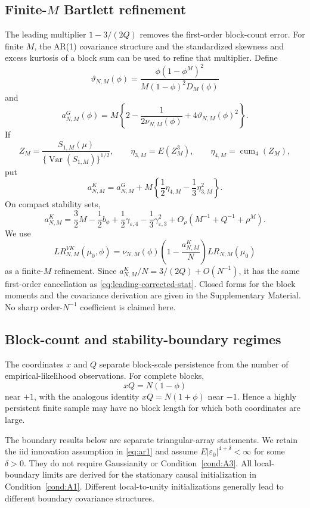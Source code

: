 \documentclass[12pt]{article}
\theoremstyle{remark}
\begin{document}
\subsection{Finite-$M$ Bartlett refinement}
The leading multiplier $1-3/(2Q)$ removes the first-order block-count error. For finite $M$, the AR(1) covariance structure and the standardized skewness and excess kurtosis of a block sum can be used to refine that multiplier. Define
\[
\vartheta_{N,M}(\phi)
=
\frac{\phi(1-\phi^M)^2}{M(1-\phi)^2D_M(\phi)}
\]
and
\begin{equation}
a^G_{N,M}(\phi)
=
M\left\{2-\frac{1}{2\nu_{N,M}(\phi)}
+4\vartheta_{N,M}(\phi)^2\right\}.
\label{eq:aG-refined}
\end{equation}
If
\[
Z_M=\frac{S_{1,M}(\mu)}{\{\operatorname{Var}(S_{1,M})\}^{1/2}},
\qquad
\eta_{3,M}=E(Z_M^3),
\qquad
\eta_{4,M}=\operatorname{cum}_4(Z_M),
\]
put
\begin{equation}
a^K_{N,M}
=
a^G_{N,M}
+
M\left\{\frac12\eta_{4,M}-\frac13\eta_{3,M}^2\right\}.
\label{eq:aK-refined}
\end{equation}
On compact stability sets,
\begin{equation}
a^K_{N,M}
=
\frac32M-\frac12b_\phi
+\frac12\gamma_{\varepsilon,4}
-\frac13\gamma_{\varepsilon,3}^2
+O_\rho(M^{-1}+Q^{-1}+\rho^M).
\label{eq:aK-expansion}
\end{equation}
We use
\begin{equation}
LR^{VK}_{N,M}(\mu_0,\phi)
=
\nu_{N,M}(\phi)
\left(1-\frac{a^K_{N,M}}{N}\right)
LR_{N,M}(\mu_0)
\label{eq:refined-stat}
\end{equation}
as a finite-$M$ refinement. Since $a^K_{N,M}/N=3/(2Q)+O(N^{-1})$, it has the same first-order cancellation as \eqref{eq:leading-corrected-stat}. Closed forms for the block moments and the covariance derivation are given in the Supplementary Material. No sharp order-$N^{-1}$ coefficient is claimed here.

\subsection{Block-count and stability-boundary regimes}
\label{sec:correction-geometry}
The coordinates $x$ and $Q$ separate block-scale persistence from the number of empirical-likelihood observations. For complete blocks,
\[
xQ=N(1-\phi)
\]
near $+1$, with the analogous identity $xQ=N(1+\phi)$ near $-1$. Hence a highly persistent finite sample may have no block length for which both coordinates are large.

The boundary results below are separate triangular-array statements. We retain the iid innovation assumption in \eqref{eq:ar1} and assume $E|\varepsilon_0|^{4+\delta}<\infty$ for some $\delta>0$. They do not require Gaussianity or Condition~\ref{cond:A3}. All local-boundary limits are derived for the stationary causal initialization in Condition~\ref{cond:A1}. Different local-to-unity initializations generally lead to different boundary covariance structures.
\end{document}
